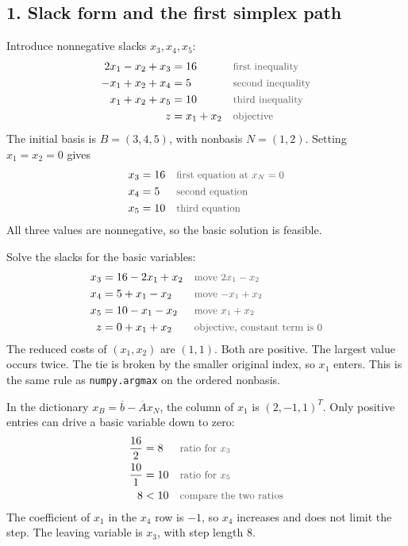 \documentclass[a4paper,11pt]{article}
\newif\ifexplain
\newcommand{\teil}[1]{\subsection*{#1}}
\newcommand{\why}[1]{\text{\small\color{black!65}#1}}
\newcommand{\explain}[1]{\ifexplain\begin{erklbox}#1\end{erklbox}\fi}
\begin{document}
\teil{1. Slack form and the first simplex path}
Introduce nonnegative slacks $x_3,x_4,x_5$:
\begin{align*}
2x_1-x_2+x_3&=16&&\why{first inequality}\\
-x_1+x_2+x_4&=5&&\why{second inequality}\\
x_1+x_2+x_5&=10&&\why{third inequality}\\
z&=x_1+x_2&&\why{objective}
\end{align*}
The initial basis is $B=(3,4,5)$, with nonbasis $N=(1,2)$. Setting $x_1=x_2=0$ gives
\begin{align*}
x_3&=16&&\why{first equation at $x_N=0$}\\
x_4&=5&&\why{second equation}\\
x_5&=10&&\why{third equation}
\end{align*}
All three values are nonnegative, so the basic solution is feasible.
\explain{Die Schlupfvariable misst, wie viel bis zur Schranke fehlt. Am Nullpunkt sind alle drei Schranken noch nicht aktiv, deshalb sind die Schlupfwerte genau die rechten Seiten. Das ist die zulässige Startbasis für den Simplex.}
Solve the slacks for the basic variables:
\begin{align*}
x_3&=16-2x_1+x_2&&\why{move $2x_1-x_2$}\\
x_4&=5+x_1-x_2&&\why{move $-x_1+x_2$}\\
x_5&=10-x_1-x_2&&\why{move $x_1+x_2$}\\
z&=0+x_1+x_2&&\why{objective, constant term is $0$}
\end{align*}
The reduced costs of $(x_1,x_2)$ are $(1,1)$. Both are positive. The largest value occurs twice. The tie is broken by the smaller original index, so $x_1$ enters. This is the same rule as \texttt{numpy.argmax} on the ordered nonbasis.
\explain{Positive reduzierte Kosten heißen: die Zielfunktion wird größer, wenn wir diese Nichtbasisvariable erhöhen und die anderen bei null lassen. Hier bringen $x_1$ und $x_2$ denselben Zuwachs pro Einheit. Die Indexregel macht den ersten Lauf eindeutig, ohne eine der beiden Richtungen zu verbieten.}
In the dictionary $x_B=\overline b-\overline A x_N$, the column of $x_1$ is $(2,-1,1)^T$. Only positive entries can drive a basic variable down to zero:
\begin{align*}
\frac{16}{2}&=8&&\why{ratio for $x_3$}\\
\frac{10}{1}&=10&&\why{ratio for $x_5$}\\
8&<10&&\why{compare the two ratios}
\end{align*}
The coefficient of $x_1$ in the $x_4$ row is $-1$, so $x_4$ increases and does not limit the step. The leaving variable is $x_3$, with step length $8$.
\end{document}
